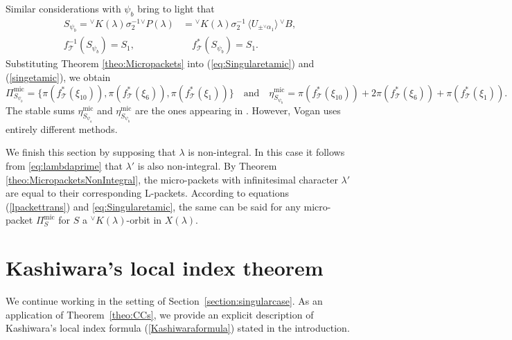 \documentclass[a4paper, 11pt]{article}
\begin{document}
Similar considerations with $\psi_{b}$ bring
to light that
\begin{align*}
S_{\psi_b}  = {}^{\vee}K(\lambda)\sigma_{2}^{-1}  {}^{\vee}P(\lambda)
& =  {}^{\vee}K(\lambda) \sigma_2^{-1} \,  \langle U_{\pm
  {^\vee}\alpha_{1}} \rangle \, {}^{\vee}B,\\
f^{-1}_{\mathcal{T}}(S_{\psi_b}) = S_1, & \quad
f^{\ast}_{\mathcal{T}}(S_{\psi_b}) = S_1.
\end{align*}
Substituting Theorem \ref{theo:Micropackets} into
(\ref{eq:Singularetamic}) and (\ref{singetamic}), we obtain
\[
\Pi_{S_{\psi_b}}^{\mathrm{mic}} =
\{\pi(f^{\ast}_{\mathcal{T}}(\xi_{10})),
\pi(f^{\ast}_{\mathcal{T}}(\xi_6)),
\pi(f^{\ast}_{\mathcal{T}}(\xi_1))\}  
\quad \text{and} \quad
\eta_{S_{\psi_b}}^{\mathrm{mic}} =
\pi(f^{\ast}_{\mathcal{T}}(\xi_{10})) +
2\pi(f^{\ast}_{\mathcal{T}}(\xi_6)) +
\pi(f^{\ast}_{\mathcal{T}}(\xi_1)). 
\]
The stable sums \(\eta_{S_{\psi_a}}^{\mathrm{mic}}\) and
\(\eta_{S_{\psi_b}}^{\mathrm{mic}}\) are the ones appearing in
\cite[Theorem 18.10]{VoganG2}.  However,  Vogan uses entirely different
methods. 


We finish this section by supposing that  $\lambda$ is
non-integral. In this case it follows from
\eqref{eq:lambdaprime} that $\lambda'$ is also non-integral.
By Theorem \ref{theo:MicropacketsNonIntegral}, 
the micro-packets with infinitesimal character 
$\lambda'$ are equal to their corresponding
L-packets.  According to equations (\ref{lpackettrans}) and
\eqref{eq:Singularetamic}, 
the same can be said for any micro-packet $\Pi_S^{\mathrm{mic}}$
for $S$ a \({}^{\vee}K(\lambda)\)-orbit in $X(\lambda)$. 


\section{Kashiwara's local index theorem}
\label{KashiwaraSection}

We continue working in the setting of
Section~\ref{section:singularcase}. As an application of
Theorem~\ref{theo:CCs}, we provide an explicit 
description of Kashiwara's local index formula
(\ref{Kashiwaraformula}) stated in the introduction.
 
 
\end{document}
